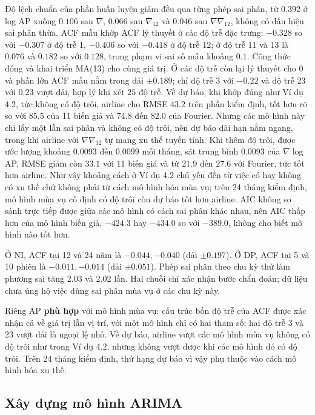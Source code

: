  Độ lệch chuẩn của phần huấn luyện giảm đều qua từng phép sai phân, từ $0.392$ ở log AP xuống $0.106$ sau $\nabla$, $0.066$ sau $\nabla_{12}$ và $0.046$ sau $\nabla\nabla_{12}$, không có dấu hiệu sai phân thừa. ACF mẫu khớp ACF lý thuyết ở các độ trễ đặc trưng: $-0.328$ so với $-0.307$ ở độ trễ 1, $-0.406$ so với $-0.418$ ở độ trễ 12; ở độ trễ 11 và 13 là $0.076$ và $0.182$ so với $0.128$, trong phạm vi sai số mẫu khoảng $0.1$. Công thức đóng và khai triển MA(13) cho cùng giá trị. Ở các độ trễ còn lại lý thuyết cho $0$ và phần lớn ACF mẫu nằm trong dải $\pm0.189$; chỉ độ trễ 3 với $-0.22$ và độ trễ 23 với $0.23$ vượt dải, hợp lý khi xét $25$ độ trễ. Về dự báo, khi khớp đúng như Ví dụ 4.2, tức không có độ trôi, airline cho RMSE $43.2$ trên phần kiểm định, tốt hơn rõ so với $85.5$ của 11 biến giả và $74.8$ đến $82.0$ của Fourier. Nhưng các mô hình này chỉ lấy một lần sai phân và không có độ trôi, nên dự báo dài hạn nằm ngang, trong khi airline với $\nabla\nabla_{12}$ tự mang xu thế tuyến tính. Khi thêm độ trôi, được ước lượng khoảng $0.0093$ đến $0.0099$ mỗi tháng, sát trung bình $0.0093$ của $\nabla\log$ AP, RMSE giảm còn $33.1$ với 11 biến giả và từ $21.9$ đến $27.6$ với Fourier, tức tốt hơn airline. Như vậy khoảng cách ở Ví dụ 4.2 chủ yếu đến từ việc có hay không có xu thế chứ không phải từ cách mô hình hóa mùa vụ; trên 24 tháng kiểm định, mô hình mùa vụ cố định có độ trôi còn dự báo tốt hơn airline. AIC không so sánh trực tiếp được giữa các mô hình có cách sai phân khác nhau, nên AIC thấp hơn của mô hình biến giả, $-424.3$ hay $-434.0$ so với $-389.0$, không cho biết mô hình nào tốt hơn.

Ở NI, ACF tại 12 và 24 năm là $-0.044,-0.040$ (dải $\pm0.197$). Ở DP, ACF tại 5 và 10 phiên là $-0.011,-0.014$ (dải $\pm0.051$). Phép sai phân theo chu kỳ thử làm phương sai tăng 2.03 và 2.02 lần. Hai chuỗi chỉ xác nhận bước chẩn đoán; dữ liệu chưa ủng hộ việc dùng sai phân mùa vụ ở các chu kỳ này.

 Riêng AP \textbf{phù hợp} với mô hình mùa vụ: cấu trúc bốn độ trễ của ACF được xác nhận cả về giá trị lẫn vị trí, với một mô hình chỉ có hai tham số; hai độ trễ 3 và 23 vượt dải là ngoại lệ nhỏ. Về dự báo, airline vượt các mô hình mùa vụ không có độ trôi như trong Ví dụ 4.2, nhưng không vượt được khi các mô hình đó có độ trôi. Trên 24 tháng kiểm định, thứ hạng dự báo vì vậy phụ thuộc vào cách mô hình hóa xu thế.

\subsection{Xây dựng mô hình ARIMA}

